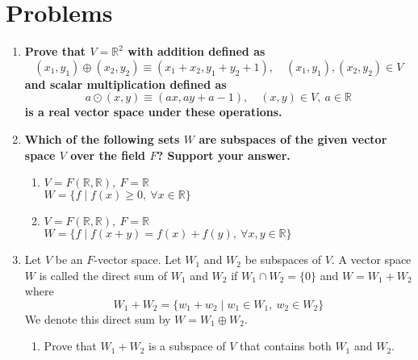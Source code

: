 \documentclass[12pt]{article}
\begin{document}
\newpage

\section*{Problems}

\begin{enumerate}

    \item \textbf{Prove that \( V = \mathbb{R}^2 \) with addition defined as}
    \[
    (x_1, y_1) \oplus (x_2, y_2) \equiv (x_1 + x_2, y_1 + y_2 + 1), \quad (x_1, y_1), (x_2, y_2) \in V
    \]
    \textbf{and scalar multiplication defined as}
    \[
    a \odot (x, y) \equiv (ax, ay + a - 1), \quad (x, y) \in V, \ a \in \mathbb{R}
    \]
    \textbf{is a real vector space under these operations.}

    \vspace{2in}

    \item \textbf{Which of the following sets \( W \) are subspaces of the given vector space \( V \) over the field \( F \)? Support your answer.}
    \begin{enumerate}[label=(\alph*)]
        \item \( V = F(\mathbb{R}, \mathbb{R}), \ F = \mathbb{R} \) \\
        \( W = \{ f \mid f(x) \geq 0, \ \forall x \in \mathbb{R} \} \)
        
        \vspace{1.5in}
        
        \item \( V = F(\mathbb{R}, \mathbb{R}), \ F = \mathbb{R} \) \\
        \( W = \{ f \mid f(x + y) = f(x) + f(y), \ \forall x, y \in \mathbb{R} \} \)
        
        \vspace{1.5in}
    \end{enumerate}

    \item Let \( V \) be an \( F \)-vector space. Let \( W_1 \) and \( W_2 \) be subspaces of \( V \). A vector space \( W \) is called the direct sum of \( W_1 \) and \( W_2 \) if \( W_1 \cap W_2 = \{0\} \) and \( W = W_1 + W_2 \) where
    \[
    W_1 + W_2 = \{ w_1 + w_2 \mid w_1 \in W_1, \ w_2 \in W_2 \}
    \]
    We denote this direct sum by \( W = W_1 \oplus W_2 \).
    \begin{enumerate}[label=(\alph*)]
        \item Prove that \( W_1 + W_2 \) is a subspace of \( V \) that contains both \( W_1 \) and \( W_2 \).
        

\end{enumerate}
\end{enumerate}
\end{document}
